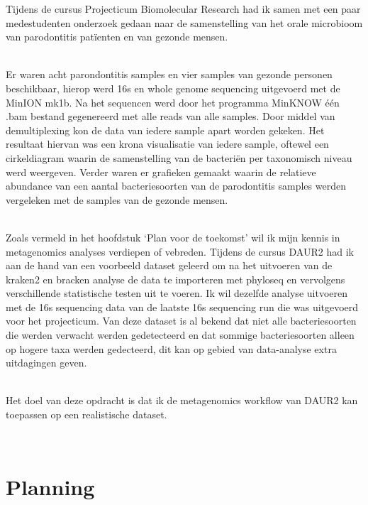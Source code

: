 \documentclass[
]{book}
\begin{document}
Tijdens de cursus Projecticum Biomolecular Research had ik samen met een paar medestudenten onderzoek gedaan naar de samenstelling van het orale microbioom van parodontitis patïenten en van gezonde mensen.\\
\strut \\
Er waren acht parondontitis samples en vier samples van gezonde personen beschikbaar, hierop werd 16s en whole genome sequencing uitgevoerd met de MinION mk1b. Na het sequencen werd door het programma MinKNOW één .bam bestand gegenereerd met alle reads van alle samples. Door middel van demultiplexing kon de data van iedere sample apart worden gekeken. Het resultaat hiervan was een krona visualisatie van iedere sample, oftewel een cirkeldiagram waarin de samenstelling van de bacteriën per taxonomisch niveau werd weergeven. Verder waren er grafieken gemaakt waarin de relatieve abundance van een aantal bacteriesoorten van de parodontitis samples werden vergeleken met de samples van de gezonde mensen.\\
\strut \\
Zoals vermeld in het hoofdstuk `Plan voor de toekomst' wil ik mijn kennis in metagenomics analyses verdiepen of vebreden. Tijdens de cursus DAUR2 had ik aan de hand van een voorbeeld dataset geleerd om na het uitvoeren van de kraken2 en bracken analyse de data te importeren met phyloseq en vervolgens verschillende statistische testen uit te voeren. Ik wil dezelfde analyse uitvoeren met de 16s sequencing data van de laatste 16s sequencing run die was uitgevoerd voor het projecticum. Van deze dataset is al bekend dat niet alle bacteriesoorten die werden verwacht werden gedetecteerd en dat sommige bacteriesoorten alleen op hogere taxa werden gedecteerd, dit kan op gebied van data-analyse extra uitdagingen geven.\\
\strut \\
Het doel van deze opdracht is dat ik de metagenomics workflow van DAUR2 kan toepassen op een realistische dataset.\\
\strut \\

\section{Planning}\label{planning}
\end{document}
